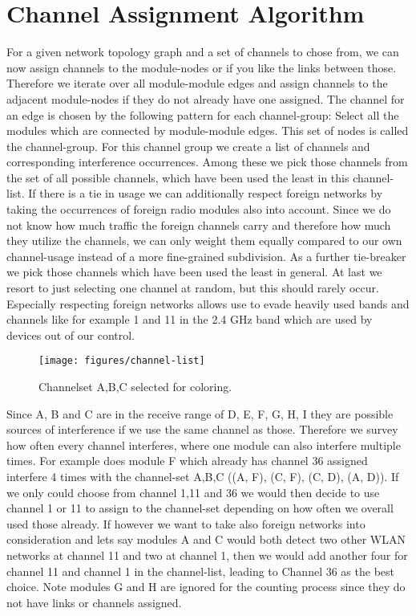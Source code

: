   \section{Channel Assignment Algorithm}
    For a given network topology graph and a set of channels to chose from, we can now assign channels to the module-nodes or if you like the links between those.
    Therefore we iterate over all module-module edges and assign channels to the adjacent module-nodes if they do not already have one assigned.
    The channel for an edge is chosen by the following pattern for each channel-group:
    Select all the modules which are connected by module-module edges.
    This set of nodes is called the channel-group.
    For this channel group we create a list of channels and corresponding interference occurrences.
    Among these we pick those channels from the set of all possible channels, which have been used the least in this channel-list.
    If there is a tie in usage we can additionally respect foreign networks by taking the occurrences of foreign radio modules also into account.
    Since we do not know how much traffic the foreign channels carry and therefore how much they utilize the channels,
    we can only weight them equally compared to our own channel-usage instead of a more fine-grained subdivision.
    As a further tie-breaker we pick those channels which have been used the least in general.
    At last we resort to just selecting one channel at random, but this should rarely occur.
    Especially respecting foreign networks allows use to evade heavily used bands and channels like for example 1 and 11 in the 2.4 GHz band which 
    are used by devices out of our control.
    
    \begin{figure}[h!]
      \centering
      \texttt{[image: figures/channel-list]}
      \caption{Channelset A,B,C selected for coloring.}
      \label{fig:channel-list}
    \end{figure}
    
\newpage
    
    Since A, B and C are in the receive range of D, E, F, G, H, I they are possible sources of interference if we use the same channel as those. 
    Therefore we survey how often every channel interferes, where one module can also interfere multiple times.
    For example does module F which already has channel 36 assigned interfere 4 times with the channel-set A,B,C ((A, F), (C, F), (C, D), (A, D)). 
    If we only could choose from channel 1,11 and 36 we would then decide to use channel 1 or 11 to assign to the channel-set depending on how often we overall used those already.
    If however we want to take also foreign networks into consideration and lets say modules A and C would both detect two other \ac{WLAN} networks at channel 11 and two
    at channel 1, then we would add another four for channel 11 and channel 1 in the channel-list, leading to Channel 36 as the best choice. 
    Note modules G and H are ignored for the counting process since they do not have links or channels assigned.
    
